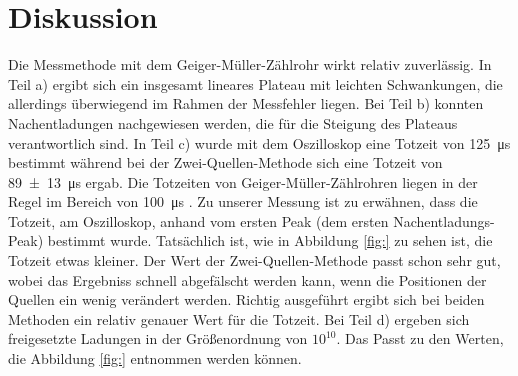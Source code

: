 \documentclass[
  bibliography=totoc,     %
  captions=tableheading,  %
  titlepage=firstiscover, %
]{scrartcl}
\begin{document}
\section{Diskussion}
\label{sec:diskussion}
Die Messmethode mit dem Geiger-Müller-Zählrohr wirkt relativ zuverlässig.
In Teil a) ergibt sich ein insgesamt lineares Plateau mit leichten Schwankungen,
die allerdings überwiegend im Rahmen der Messfehler liegen.
Bei Teil b) konnten Nachentladungen nachgewiesen werden, die für die Steigung
des Plateaus verantwortlich sind.
In Teil c) wurde mit dem Oszilloskop eine Totzeit von \SI{125}{\micro\second} bestimmt
während bei der Zwei-Quellen-Methode sich eine Totzeit von \SI{89(13)}{\micro\second}
ergab. Die Totzeiten von Geiger-Müller-Zählrohren liegen in der Regel im Bereich
von \SI{100}{\micro\second} \cite{geigerwiki}.
Zu unserer Messung ist zu erwähnen, dass die Totzeit, am Oszilloskop, anhand vom ersten
Peak (dem ersten Nachentladungs-Peak) bestimmt wurde. Tatsächlich ist, wie in Abbildung
\ref{fig:} zu sehen ist, die Totzeit etwas kleiner. Der Wert der Zwei-Quellen-Methode
passt schon sehr gut, wobei das Ergebniss schnell abgefälscht werden kann, wenn die
Positionen der Quellen ein wenig verändert werden.
Richtig ausgeführt ergibt sich bei beiden Methoden ein relativ genauer Wert für
die Totzeit.
Bei Teil d) ergeben sich freigesetzte Ladungen in der Größenordnung von $10^10$.
Das Passt zu den Werten, die Abbildung \ref{fig:} entnommen werden können.
\end{document}
